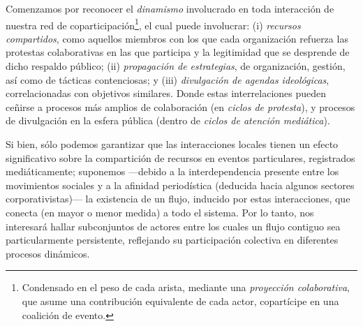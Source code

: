 \documentclass[letterpaper, 11pt]{book}
\theoremstyle{definition}
\theoremstyle{remark}
\begin{document}
Comenzamos por reconocer el \emph{dinamismo} involucrado en toda interacción de nuestra red de coparticipación\footnote{
    Condensado en el peso de cada arista, mediante una \emph{proyección colaborativa}, que asume una contribución equivalente de cada actor, copartícipe en una coalición de evento. 
}, el cual puede involucrar: 
(i) \emph{recursos compartidos}, como aquellos miembros con los que cada organización refuerza las protestas colaborativas en las que participa y la legitimidad que se desprende de dicho respaldo público; 
(ii) \emph{propagación de estrategias}, de organización, gestión, así como de tácticas contenciosas; 
y (iii) \emph{divulgación de agendas ideológicas}, correlacionadas con objetivos similares. 
Donde estas interrelaciones pueden ceñirse a procesos más amplios de colaboración (en \emph{ciclos de protesta}), y procesos de divulgación en la esfera pública (dentro de \emph{ciclos de atención mediática}). 


Si bien, sólo podemos garantizar que las interacciones locales tienen un efecto significativo sobre la compartición de recursos en eventos particulares, registrados mediáticamente; suponemos ---debido a la interdependencia presente entre los movimientos sociales y a la afinidad periodística (deducida hacia algunos sectores corporativistas)--- 
la existencia de un flujo, inducido por estas interacciones, que conecta (en mayor o menor medida) a todo el sistema. 
Por lo tanto, nos interesará hallar subconjuntos de actores entre los cuales un flujo contiguo sea particularmente persistente, reflejando su participación colectiva en diferentes procesos dinámicos. 
\end{document}

